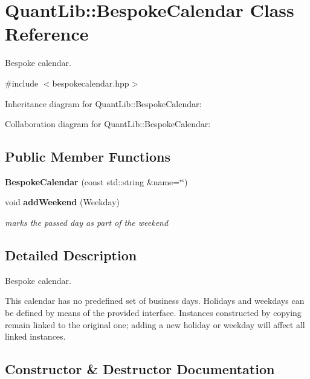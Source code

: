 \section{Quant\+Lib\+:\+:Bespoke\+Calendar Class Reference}
\label{class_quant_lib_1_1_bespoke_calendar}


Bespoke calendar.  




{\ttfamily \#include $<$bespokecalendar.\+hpp$>$}



Inheritance diagram for Quant\+Lib\+:\+:Bespoke\+Calendar\+:


Collaboration diagram for Quant\+Lib\+:\+:Bespoke\+Calendar\+:
\subsection*{Public Member Functions}
\begin{DoxyCompactItemize}
\item 
{\bf Bespoke\+Calendar} (const std\+::string \&name=\char`\"{}\char`\"{})
\item 
void {\bf add\+Weekend} (Weekday)
\begin{DoxyCompactList}\small\item\em marks the passed day as part of the weekend \end{DoxyCompactList}\end{DoxyCompactItemize}


\subsection{Detailed Description}
Bespoke calendar. 

This calendar has no predefined set of business days. Holidays and weekdays can be defined by means of the provided interface. Instances constructed by copying remain linked to the original one; adding a new holiday or weekday will affect all linked instances. 

\subsection{Constructor \& Destructor Documentation}

